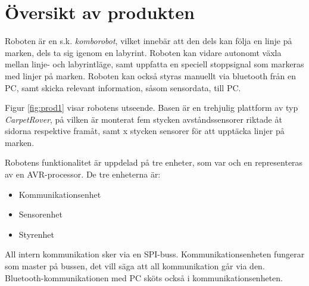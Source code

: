 
%
%
 
\section{Översikt av produkten}

Roboten är en s.k. \emph{komborobot}, vilket innebär att den dels kan följa en 
linje på marken, dels ta sig igenom en labyrint. Roboten kan vidare autonomt 
växla mellan linje- och labyrintläge, samt uppfatta en speciell stoppsignal som
markeras med linjer på marken. Roboten kan också styras manuellt via bluetooth 
från en PC, samt skicka relevant information, såsom sensordata, till PC. 

Figur \ref{fig:prod1} visar robotens utseende. Basen är en trehjulig plattform 
av typ \emph{CarpetRover}, på vilken är monterat fem stycken avståndssensorer 
riktade åt sidorna respektive framåt, samt x stycken sensorer för att upptäcka 
linjer på marken. 


Robotens funktionalitet är uppdelad på tre enheter, som var och en 
representeras av en AVR-processor. De tre enheterna är: 
\begin{itemize}
        \item Kommunikationsenhet
        \item Sensorenhet
        \item Styrenhet
\end{itemize}

All intern kommunikation sker via en SPI-buss. 
Kommunikationsenheten fungerar som master på bussen, det vill säga att all 
kommunikation går via den. Bluetooth-kommunikationen med PC sköts också i 
kommunikationsenheten.
